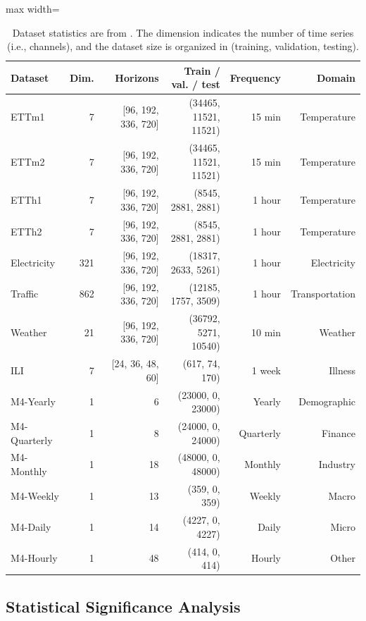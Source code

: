 \begin{table}[htbp]\centering\small
\caption{Dataset statistics are from \citep{wu2022timesnet}. The dimension indicates the number of time series (i.e., channels), and the dataset size is organized in (training, validation, testing).}\label{tab:dataset}
\setlength{\tabcolsep}{4pt}\renewcommand{\arraystretch}{1.25}
\begin{adjustbox}{max width=\linewidth}\begin{tabular}{lrrrrr}\toprule
\textbf{Dataset} & \textbf{Dim.} & \textbf{Horizons} & \textbf{Train / val. / test} & \textbf{Frequency} & \textbf{Domain}\\\midrule
ETTm1 & 7 & [96, 192, 336, 720] & (34465, 11521, 11521) & 15 min & Temperature\\
ETTm2 & 7 & [96, 192, 336, 720] & (34465, 11521, 11521) & 15 min & Temperature\\
ETTh1 & 7 & [96, 192, 336, 720] & (8545, 2881, 2881) & 1 hour & Temperature\\
ETTh2 & 7 & [96, 192, 336, 720] & (8545, 2881, 2881) & 1 hour & Temperature\\
Electricity & 321 & [96, 192, 336, 720] & (18317, 2633, 5261) & 1 hour & Electricity\\
Traffic & 862 & [96, 192, 336, 720] & (12185, 1757, 3509) & 1 hour & Transportation\\
Weather & 21 & [96, 192, 336, 720] & (36792, 5271, 10540) & 10 min & Weather\\
ILI & 7 & [24, 36, 48, 60] & (617, 74, 170) & 1 week & Illness\\
M4-Yearly & 1 & 6 & (23000, 0, 23000) & Yearly & Demographic\\
M4-Quarterly & 1 & 8 & (24000, 0, 24000) & Quarterly & Finance\\
M4-Monthly & 1 & 18 & (48000, 0, 48000) & Monthly & Industry\\
M4-Weekly & 1 & 13 & (359, 0, 359) & Weekly & Macro\\
M4-Daily & 1 & 14 & (4227, 0, 4227) & Daily & Micro\\
M4-Hourly & 1 & 48 & (414, 0, 414) & Hourly & Other\\
\bottomrule\end{tabular}\end{adjustbox}\end{table}

\subsection{Statistical Significance Analysis}
\label{sec:statistical_significance}

